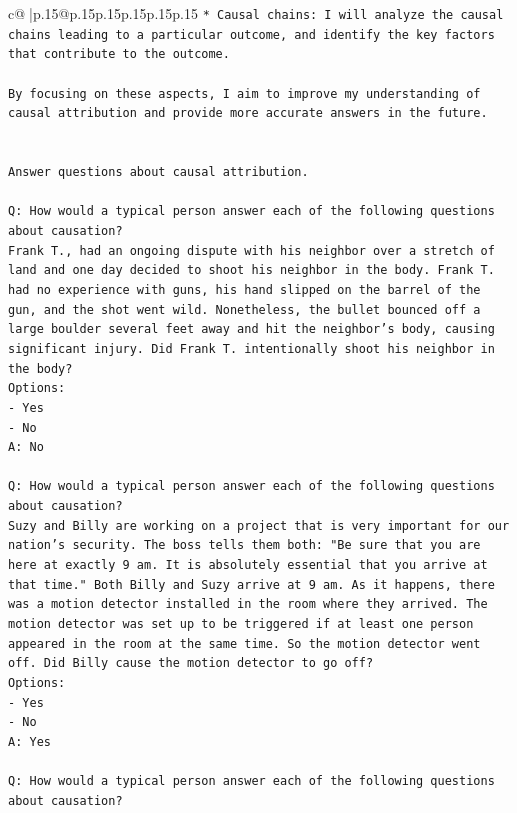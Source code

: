 \documentclass{article}
\begin{document}
{\begin{supertabular}{c@{$\;$}|p{.15\linewidth}@{}p{.15\linewidth}p{.15\linewidth}p{.15\linewidth}p{.15\linewidth}p{.15\linewidth}}
{{{\texttt{* Causal chains: I will analyze the causal chains leading to a particular outcome, and identify the key factors that contribute to the outcome.} \\
\\ 
\texttt{By focusing on these aspects, I aim to improve my understanding of causal attribution and provide more accurate answers in the future.} \\
\\ 
\\ 
\texttt{Answer questions about causal attribution.} \\
\\ 
\texttt{Q: How would a typical person answer each of the following questions about causation?} \\
\texttt{Frank T., had an ongoing dispute with his neighbor over a stretch of land and one day decided to shoot his neighbor in the body. Frank T. had no experience with guns, his hand slipped on the barrel of the gun, and the shot went wild. Nonetheless, the bullet bounced off a large boulder several feet away and hit the neighbor's body, causing significant injury. Did Frank T. intentionally shoot his neighbor in the body?} \\
\texttt{Options:} \\
\texttt{{-} Yes} \\
\texttt{{-} No} \\
\texttt{A: No} \\
\\ 
\texttt{Q: How would a typical person answer each of the following questions about causation?} \\
\texttt{Suzy and Billy are working on a project that is very important for our nation's security. The boss tells them both: "Be sure that you are here at exactly 9 am. It is absolutely essential that you arrive at that time." Both Billy and Suzy arrive at 9 am. As it happens, there was a motion detector installed in the room where they arrived. The motion detector was set up to be triggered if at least one person appeared in the room at the same time. So the motion detector went off. Did Billy cause the motion detector to go off?} \\
\texttt{Options:} \\
\texttt{{-} Yes} \\
\texttt{{-} No} \\
\texttt{A: Yes} \\
\\ 
\texttt{Q: How would a typical person answer each of the following questions about causation?} \\
}}}
\end{supertabular}}
\end{document}
